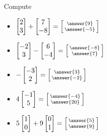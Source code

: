 \documentclass{ximera}
\begin{document}
\begin{exercise}
    Compute
    \begin{itemize}
        \item
        $\begin{bmatrix} 2 \\ 3  \end{bmatrix} + \begin{bmatrix} 7 \\ -8 \end{bmatrix} = \left[\begin{smallmatrix} \answer{9} \\ \answer{-5} \end{smallmatrix}\right]$
        \item
        $\begin{bmatrix}  -2 \\  3  \end{bmatrix} - \begin{bmatrix} 6 \\ -4 \end{bmatrix} = \left[\begin{smallmatrix}  \answer{-8} \\ \answer{7} \end{smallmatrix}\right]$
        \item
        $-\begin{bmatrix} -3 \\ 2  \end{bmatrix} = \left[\begin{smallmatrix} \answer{3} \\ \answer{-2} \end{smallmatrix}\right]$
        \item
        $4\begin{bmatrix} -1 \\ 5  \end{bmatrix} = \left[\begin{smallmatrix} \answer{-4} \\ \answer{20} \end{smallmatrix}\right]$
        \item
        $5\begin{bmatrix} 1 \\ 0  \end{bmatrix} + 9 \begin{bmatrix} 0 \\ 1 \end{bmatrix} = \left[\begin{smallmatrix} \answer{5} \\ \answer{9} \end{smallmatrix}\right]$

\end{itemize}
\end{exercise}
\end{document}
